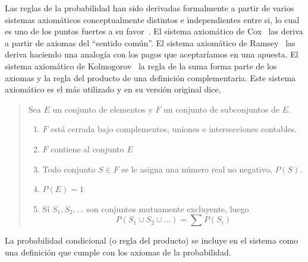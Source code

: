 \documentclass[a4paper,11pt]{book}
\theoremstyle{definition}
\begin{document}
Las reglas de la probabilidad han sido derivadas formalmente a partir de varios sistemas axiomáticos conceptualmente distintos e independientes entre si, lo cual es uno de los puntos fuertes a su favor~\cite{halpern2017}.
%
El sistema axiomático de Cox~\cite{cox} las deriva a partir de axiomas del ``sentido común''.
%
El sistema axiomático de Ramsey~\cite{ramsey} las deriva haciendo una analogía con los pagos que aceptaríamos en una apuesta.
%
El sistema axiomático de Kolmogorov~\cite{kolmogorov} la regla de la suma forma parte de los axiomas y la regla del producto de una definición complementaria.
%
Este sistema axiomático es el más utilizado y en su versión original dice,
\begin{quotation}
Sea $E$ un conjunto de elementos y $F$ un conjunto de subconjuntos de $E$.
%
\begin{enumerate}\itemsep-0.05cm
\item $F$ está cerrada bajo complementos, uniones e intersecciones contables.
\item $F$ contiene al conjunto $E$
\item Todo conjunto $S \in F$ se le asigna una número real no negativo, $P(S)$.
\item $P(E) = 1$
\item Si $S_1, S_2, \dots$ son conjuntos mutuamente excluyente, luego
\begin{equation}
P(S_1 \cup S_2 \cup \dots ) = \sum P(S_i)
\end{equation}
\end{enumerate}
\end{quotation}
%
La probabilidad condicional (o regla del producto) se incluye en el sistema como una definición que cumple con los axiomas de la probabilidad.



\end{document}
